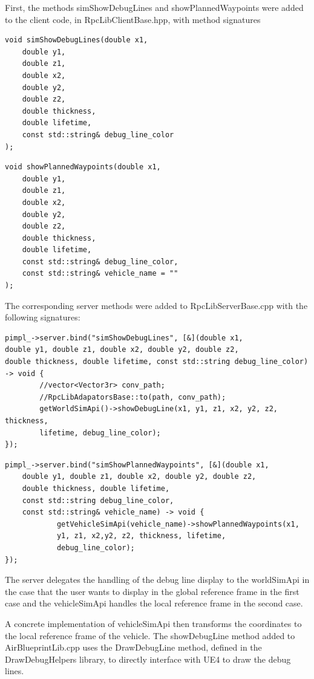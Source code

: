 First, the methods simShowDebugLines and showPlannedWaypoints were added to the client code, in RpcLibClientBase.hpp, with method signatures
\begin{verbatim}
void simShowDebugLines(double x1, 
    double y1,
    double z1,
    double x2,
    double y2,
    double z2,
    double thickness, 
    double lifetime,
    const std::string& debug_line_color
);
\end{verbatim}
\begin{verbatim}
void showPlannedWaypoints(double x1, 
    double y1, 
    double z1, 
    double x2, 
    double y2, 
    double z2, 
    double thickness, 
    double lifetime,
    const std::string& debug_line_color,
    const std::string& vehicle_name = ""
);
\end{verbatim}

The corresponding server methods were added to RpcLibServerBase.cpp with the following signatures:
\begin{verbatim}
pimpl_->server.bind("simShowDebugLines", [&](double x1,
double y1, double z1, double x2, double y2, double z2,
double thickness, double lifetime, const std::string debug_line_color)
-> void {
		//vector<Vector3r> conv_path;
		//RpcLibAdapatorsBase::to(path, conv_path);
		getWorldSimApi()->showDebugLine(x1, y1, z1, x2, y2, z2, thickness, 
		lifetime, debug_line_color);
});
\end{verbatim}

\begin{verbatim}
pimpl_->server.bind("simShowPlannedWaypoints", [&](double x1, 
    double y1, double z1, double x2, double y2, double z2, 
    double thickness, double lifetime, 
    const std::string debug_line_color,
    const std::string& vehicle_name) -> void {
            getVehicleSimApi(vehicle_name)->showPlannedWaypoints(x1, 
            y1, z1, x2,y2, z2, thickness, lifetime, 
            debug_line_color);
});
\end{verbatim}

The server delegates the handling of the debug line display to the worldSimApi in the case that the user wants to display in the global reference frame in the first case and the vehicleSimApi handles the local reference frame in the second case. 

A concrete implementation of vehicleSimApi then transforms the coordinates to the local reference frame of the vehicle. The showDebugLine method added to AirBlueprintLib.cpp uses the DrawDebugLine method, defined in the DrawDebugHelpers library, to directly interface with UE4 to draw the debug lines.


